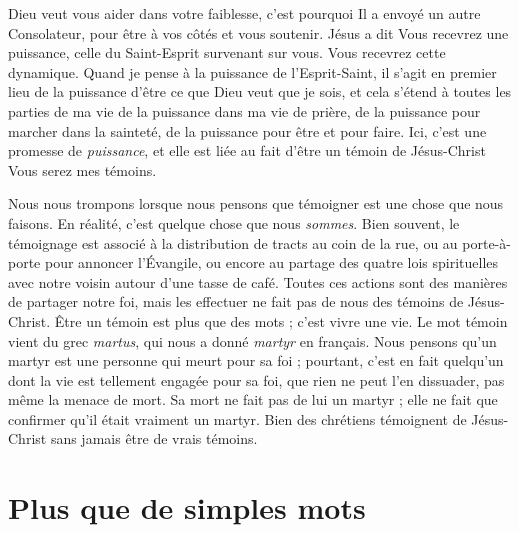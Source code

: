 Dieu veut vous aider dans votre faiblesse,
 c'est pourquoi Il a envoyé un autre Consolateur,
 pour être à vos côtés et vous soutenir. Jésus a dit\frcolon{}
 \Og Vous recevrez une puissance,
 celle du Saint-Esprit survenant sur vous. \Fg{}
 Vous recevrez cette dynamique. Quand je pense à la puissance
 de l'Esprit-Saint, il s'agit en premier lieu de
 la puissance d'être ce que Dieu
 veut que je sois, et cela s'étend à toutes les parties de ma vie\frcolon{}
 de la puissance dans ma vie de prière, de la puissance pour marcher
 dans la sainteté, de la puissance pour être et pour faire.
 Ici, c'est une promesse de \emph{puissance}, et elle est liée au fait
 d'être un témoin de Jésus-Christ\frcolon{} \Og Vous serez mes témoins. \Fg{}

Nous nous trompons lorsque nous pensons que témoigner
 est une chose que nous faisons.
 En réalité, c'est quelque chose que nous \emph{som\-mes}.
 Bien souvent, le témoignage est associé à la distribution de tracts
 au coin de la rue, ou au porte-à-porte pour annoncer l'Évangile,
 ou encore au partage des quatre lois spirituelles avec notre voisin
 autour d'une tasse de café.
 Toutes ces actions sont des manières de partager notre foi,
 mais les effectuer ne fait pas de nous des témoins de Jésus-Christ.
 Être un témoin est plus que des mots ; c'est vivre une vie.
 Le mot \Og témoin \Fg{} vient du grec \emph{martus},
 qui nous a donné \emph{martyr} en français.
 Nous pensons qu'un martyr est une personne qui meurt pour sa foi ;
 pourtant, c'est en fait quelqu'un dont la vie est tellement engagée
 pour sa foi, que rien ne peut l'en dissuader, pas même la menace de mort.
 Sa mort ne fait pas de lui un martyr ; elle ne fait que confirmer
 qu'il était vraiment un martyr.
 Bien des chrétiens témoignent de Jésus-Christ
 sans jamais être de vrais témoins.

\section{Plus que de simples mots}

